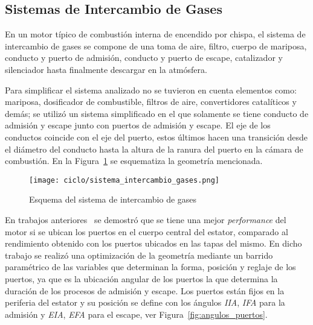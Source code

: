  
   



\subsection{Sistemas de Intercambio de Gases}
%
En un motor típico de combustión interna de encendido por chispa, el sistema de
intercambio de gases se compone de una toma de aire, filtro, cuerpo de mariposa,
conducto y puerto de admisión, conducto y puerto de escape, catalizador y
silenciador hasta finalmente descargar en la atmósfera.

Para simplificar el sistema analizado no se tuvieron en cuenta elementos como:
mariposa, dosificador de combustible, filtros de aire, convertidores catalíticos
y demás; se utilizó un sistema simplificado en el que solamente se tiene
conducto de admisión y escape junto con puertos de admisión y escape.
%
El eje de los conductos coincide con el eje del puerto, estos últimos hacen una
transición desde el diámetro del conducto hasta la altura de la ranura del
puerto en la cámara de combustión.
%
En la Figura~\ref{fig:sistema_intercambio_gases} se esquematiza la geometría
mencionada.

\begin{figure}[h!]  \centering
  \texttt{[image: ciclo/sistema\_intercambio\_gases.png]}
  \caption{Esquema del sistema de intercambio de gases}\label{fig:sistema_intercambio_gases}
\end{figure}


En trabajos anteriores~\parencite{lopez13} se demostró que se tiene una mejor
\emph{performance} del motor si se ubican los puertos en el cuerpo central del
estator, comparado al rendimiento obtenido con los puertos ubicados en las tapas
del mismo.
%
En dicho trabajo se realizó una optimización de la geometría mediante un barrido
paramétrico de las variables que determinan la forma, posición y reglaje de los
puertos, ya que es la ubicación angular de los puertos la que determina la
duración de los procesos de admisión y escape.
%
Los puertos están fijos en la periferia del estator y su posición se define con
los ángulos \emph{IIA}, \emph{IFA} para la admisión y \emph{EIA}, \emph{EFA}
para el escape, ver Figura~\ref{fig:angulos_puertos}.


